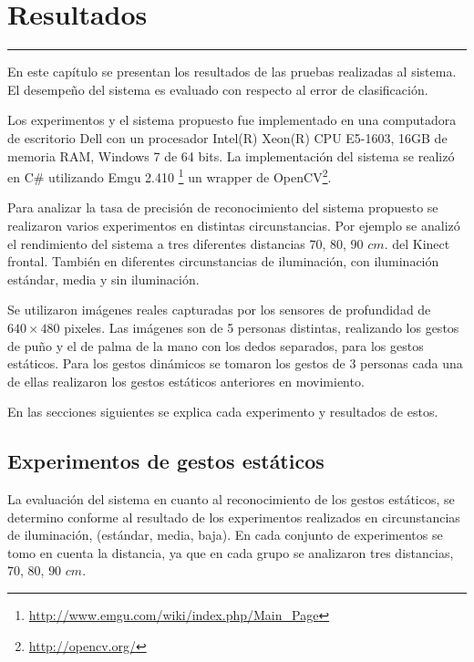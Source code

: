\chapter{Resultados}\label{capit:cap5}
\vspace{-2.0325ex}%
\noindent
\rule{\textwidth}{0.5pt}
\vspace{-5.5ex}%
\newcommand{\pushline}{\Indp}%

En este capítulo se presentan los resultados de las pruebas realizadas al sistema. El desempeño del sistema es evaluado con respecto al error de clasificación.   

Los experimentos y el sistema propuesto fue implementado en una computadora de escritorio Dell con un procesador Intel(R) Xeon(R) CPU E5-1603, 16GB de memoria RAM, Windows 7 de 64 bits. La implementación del sistema se realizó en C\# utilizando Emgu 2.410 \footnote{\url{http://www.emgu.com/wiki/index.php/Main\_Page}} un wrapper de OpenCV\footnote{\url{http://opencv.org/}}. 

Para analizar la tasa de precisión de reconocimiento del sistema propuesto se realizaron varios experimentos en distintas circunstancias. Por ejemplo se analizó el rendimiento del sistema a tres diferentes distancias $70$, $80$, $90$ $cm.$ del Kinect frontal. También en diferentes circunstancias de iluminación, con iluminación estándar, media y sin iluminación. 


Se utilizaron imágenes reales capturadas por los sensores de profundidad de $640 \times 480$ pixeles. Las imágenes son de 5 personas distintas, realizando los gestos de puño y el de palma de la mano con los dedos separados, para los gestos estáticos. Para los gestos dinámicos se tomaron los gestos de $3$ personas cada una de ellas realizaron los gestos estáticos anteriores en movimiento.   

En las secciones siguientes se explica cada experimento y resultados de estos.  

\section{Experimentos de gestos estáticos}\label{TestStaticGestures}  

La evaluación del sistema en cuanto al reconocimiento de los gestos estáticos, se determino conforme al resultado de los experimentos realizados en circunstancias de iluminación, (estándar, media, baja). En cada conjunto de experimentos se tomo en cuenta la distancia, ya que en cada grupo se analizaron tres distancias, $70$, $80$, $90$ $cm$.  

